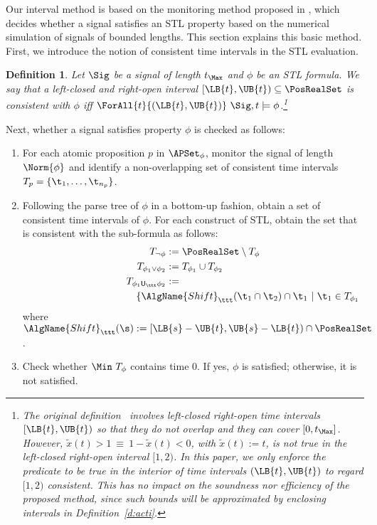 \documentclass[paper]{ieice}
\newcommand{\Until}{\mathsf{U}}
\newtheorem{definition}{Definition}
\begin{document}
Our interval method is based on the monitoring method proposed in \cite{Maler2003}, which decides whether a signal satisfies an STL property based on the numerical simulation of signals of bounded lengths.
This section explains this basic method.
First, we introduce the notion of consistent time intervals in the STL evaluation.
\begin{definition} \label{th:consistent}
	Let $\Sig$ be a signal of length $t_\Max$ and $\phi$ be an STL formula.
	We say that a left-closed and right-open interval $[\LB{t},\UB{t}) \subseteq \PosRealSet$ is \emph{consistent} with $\phi$ iff $\ForAll{t}{(\LB{t},\UB{t})}~ \Sig,t \models \phi$.\footnote{The original definition~\cite{Maler2003} involves left-closed right-open time intervals $[\LB{t},\UB{t})$ so that they do not overlap and they can cover $[0,t_\Max]$. However, $\tilde{x}(t)>1 \ \equiv\ 1-\tilde{x}(t)<0$, with $\tilde{x}(t) := t$, is not true in the left-closed right-open interval $[1,2)$. In this paper, we only enforce the predicate to be true in the interior of time intervals $(\LB{t},\UB{t})$ to regard $[1,2)$ consistent. This has no impact on the soundness nor efficiency of the proposed method, since such bounds will be approximated by enclosing intervals in Definition~\ref{d:acti}.}
\end{definition}

Next, whether a signal satisfies property $\phi$ is checked as follows:
\begin{enumerate}
	\item For each atomic proposition $p$ in $\APSet_\phi$, monitor the signal of length $\Norm{\phi}$ and identify a non-overlapping set of consistent time intervals $T_p = \{\t_1,\ldots,\t_{n_p}\}$.
\item Following the parse tree of $\phi$ in a bottom-up fashion, obtain a set of consistent time intervals of $\phi$. For each construct of STL, obtain the set that is consistent with the sub-formula as follows:
\begin{align}
	T_{\neg \phi} &:= 
\PosRealSet \setminus T_\phi \label{e:op:neg} \\
	T_{\phi_1\lor \phi_2} &:= T_{\phi_1} \cup T_{\phi_2} \label{e:op:lor} \\
	T_{\phi_1 \Until_{\ttt} \phi_2} &:= \nonumber \\
	\omit\rlap{\quad $\{\AlgName{Shift}_{\ttt}(\t_1 \cap \t_2) \cap \t_1 ~|~
	\t_1 \in T_{\phi_1}, \t_2 \in T_{\phi_2} \}$} \label{e:op:until}
\end{align}
where $\AlgName{Shift}_{\ttt}(\s) := [\LB{s}-\UB{t}, \UB{s}-\LB{t}) \cap \PosRealSet$.
\item Check whether $\Min\ T_\phi$ contains time 0.
	If yes, $\phi$ is satisfied; otherwise, it is not satisfied.
\end{enumerate}
\end{document}
